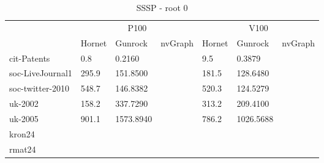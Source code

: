 \begin{table}[t]
\begin{center}
\caption{SSSP - root 0}
\begin{tabular}{l|l|l|l|l|l|l|}
\cline{2-7}
                                          & \multicolumn{3}{c|}{P100}  & \multicolumn{3}{c|}{V100}  \\ \cline{2-7} 
                                          & Hornet & Gunrock & nvGraph & Hornet & Gunrock & nvGraph \\ \hline
\multicolumn{1}{|l|}{cit-Patents}         &0.8&0.2160&         &9.5&0.3879&         \\ \hline %
\multicolumn{1}{|l|}{soc-LiveJournal1}    &295.9&151.8500&         &181.5&128.6480&         \\ \hline %
\multicolumn{1}{|l|}{soc-twitter-2010}    &548.7&146.8382&         &520.3&124.5279&         \\ \hline %
\multicolumn{1}{|l|}{uk-2002}             &158.2&337.7290&         &313.2&209.4100&         \\ \hline %
\multicolumn{1}{|l|}{uk-2005}             &901.1&1573.8940&         &786.2&1026.5688&         \\ \hline %
\multicolumn{1}{|l|}{kron24}              &        &         &         &        &         &         \\ \hline %
\multicolumn{1}{|l|}{rmat24}              &        &         &         &        &         &         \\ \hline %
\end{tabular}


\end{center}
\end{table}
